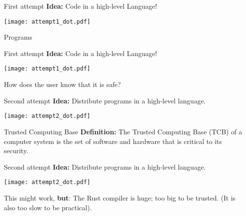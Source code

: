 \begin{frame}[fragile]{First attempt}
  \textbf{Idea:} Code in a high-level Language!

  \pause\texttt{[image: attempt1\_dot.pdf]}
\end{frame}

\begin{frame}{Programs}{}
\end{frame}

\begin{frame}[fragile]{First attempt}
  \textbf{Idea:} Code in a high-level Language!

  \texttt{[image: attempt1\_dot.pdf]}

  \pause How does the user know that it is safe?
\end{frame}

\begin{frame}[fragile]{Second attempt}
  \textbf{Idea:} Distribute programs in a high-level language.

  \pause \texttt{[image: attempt2\_dot.pdf]}
\end{frame}

\begin{frame}{Trusted Computing Base}
  \textbf{Definition:} The Trusted Computing Base (TCB) of a computer system is
  the set of software and hardware that is critical to its security.
\end{frame}

\begin{frame}[fragile]{Second attempt}
  \textbf{Idea:} Distribute programs in a high-level language.

  \texttt{[image: attempt2\_dot.pdf]}

  \pause This might work, \textbf{but}: The Rust compiler is huge; too big to be
  trusted. (It is also too slow to be practical).
\end{frame}

